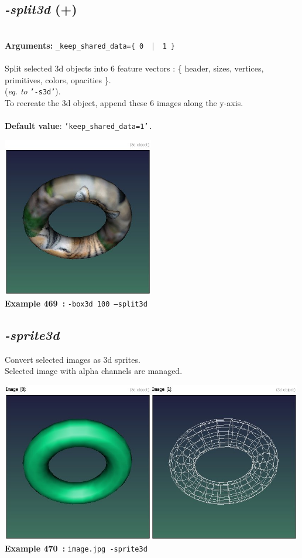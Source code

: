 \documentclass[a4paper,11pt,twoside]{book}
\begin{document}
\subsection{\emph{-split3d} (+)}\vspace*{-0.5em}
~\\\textbf{Arguments: } 
{\small \texttt{\_keep\_shared\_data=\{ 0 ~$|$~ 1 \}}}\\~\\
Split selected 3d objects into 6 feature vectors :
\{ header, sizes, vertices, primitives, colors, opacities \}.
~\\(\emph{eq. to} {\small \texttt{'-s3d'}}).
~\\To recreate the 3d object, append these 6 images along the y-axis.
~\\~\\\textbf{Default value}: {\small \texttt{'keep\_shared\_data=1'.}}
\begin{center}\includegraphics[keepaspectratio=true,height=7cm,width=\textwidth]{img/gmic_def469.jpg}\\
{\footnotesize \textbf{Example 469~:} \texttt{-box3d 100 --split3d}}
\end{center}

\subsection{\emph{-sprite3d} }\vspace*{-0.5em}
Convert selected images as 3d sprites.
~\\Selected image with alpha channels are managed.
\begin{center}\includegraphics[keepaspectratio=true,height=7cm,width=\textwidth]{img/gmic_def470.jpg}\\
{\footnotesize \textbf{Example 470~:} \texttt{image.jpg -sprite3d}}
\end{center}
\end{document}
